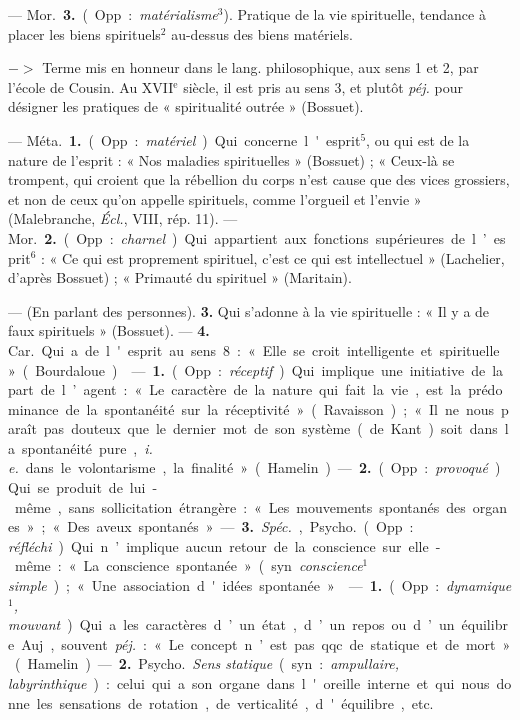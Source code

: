 \begin{itemize}[leftmargin=1cm, label=, itemsep=1pt]
—  \si{Mor.} {\bf 3.} (Opp. : {\it matérialisme}$^3$).
Pratique de la vie spirituelle, tendance à placer les biens
spirituels$^2$ au-dessus des biens matériels.

$->$ Terme mis en honneur dans le lang. philosophique, aux sens 1 et 2, par
l’école de Cousin. Au {\footnotesize XVII}$^\text{e}$ siècle, il est pris au
sens 3, et plutôt {\it péj.} pour désigner les pratiques de « spiritualité
outrée » (Bossuet).

 — \si{Méta.} {\bf 1.} (Opp. : {\it matériel}). Qui concerne
l'esprit$^5$, ou qui est de la nature de l'esprit : « Nos maladies
spirituelles » (Bossuet) ; « Ceux-là se trompent, qui croient que la
rébellion du corps n'est cause que des vices grossiers, et non de ceux
qu’on appelle spirituels, comme l’orgueil et l’envie » (Malebranche,
{\it Écl.}, VIII, rép. 11). — \si{Mor.} {\bf 2.} (Opp. : {\it charnel}). Qui
appartient aux fonctions supérieures de l’esprit$^6$ : « Ce qui est
proprement spirituel, c’est ce qui est intellectuel » (Lachelier, d’après
Bossuet) ; « Primauté du spirituel » (Maritain).

— (En parlant des personnes).  {\bf 3.} Qui s’adonne à la vie spirituelle : «
Il y a de faux spirituels » (Bossuet). — {\bf 4.} \si{Car.} Qui a de l'esprit
au sens 8: « Elle se croit intelligente et spirituelle » (Bourdaloue).

 — {\bf 1.} (Opp. : {\it réceptif}). Qui implique une initiative
de la part de l’agent : « Le caractère de la nature qui fait la vie, est la
prédominance de la spontanéité sur la réceptivité » (Ravaisson) ; « Il ne
nous paraît pas douteux que le dernier mot de son système (de Kant) soit dans
la spontanéité pure, {\it i. e.} dans le volontarisme, la finalité
» (Hamelin). — {\bf 2.} (Opp. : {\it provoqué}). Qui se produit de lui-même,
sans sollicitation étrangère : « Les mouvements spontanés des organes »; «
Des aveux spontanés ». — {\bf 3.} {\it Spéc.}, \si{Psycho.} (Opp. : {\it
réfléchi}). Qui n’implique aucun retour de la conscience sur elle-même : « La
conscience spontanée » (syn. {\it conscience$^1$ simple}) ; « Une association
d'idées spontanée ».

 — {\bf 1.} (Opp. : {\it dynamique$^1$, mouvant}). Qui a
les caractères d’un état, d’un repos ou d’un équilibre. Auj.,
souvent {\it péj.} : « Le concept n’est pas qqc. de statique et de mort
» (Hamelin). — {\bf 2.} \si{Psycho.} {\it Sens statique} (syn. :
{\it ampullaire, labyrinthique}) : celui qui a son organe dans l'oreille
interne et qui nous donne les sensations de rotation, de verticalité,
d'équilibre, etc.


\end{itemize}
